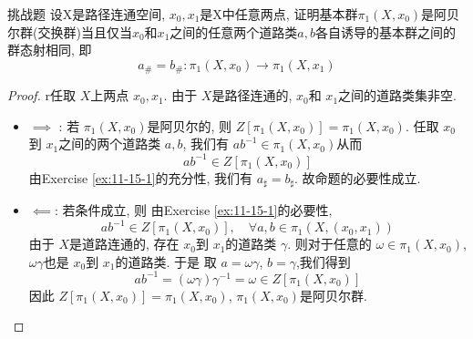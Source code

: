 \documentclass[../main.tex]{subfiles}
\begin{document}
\begin{exercise}{挑战题}{}
设X是路径连通空间, $x_0, x_1$是X中任意两点, 证明基本群$\pi_1(X, x_0)$是阿贝尔群(交换群)当且仅当$x_0$和$x_1$之间的任意两个道路类$a, b$各自诱导的基本群之间的群态射相同, 即
\[
a_\# = b_\#: \pi_1(X, x_0) \longrightarrow \pi_1(X, x_1)
\]
\end{exercise}

\begin{proof}
   
r任取 \(  X  \)上两点 \(  x_0,x_1  \).   由于 \(  X  \)是路径连通的, \(   x_0  \)和 \(  x_1  \)之间的道路类集非空. 
   \begin{itemize}
    \item \(  \implies   \) : 若 \(   \pi _1 \left( X,x_0 \right)   \)是阿贝尔的, 则 \(  Z[ \pi _1 \left( X,x_0 \right) ] =  \pi _1 \left( X,x_0 \right)  \).   任取 \(  x_0  \)到 \(  x_1  \)之间的两个道路类 \(  a,b  \), 我们有 \(  ab^{-1}   \in  \pi _1 \left( X,x_0 \right) \)从而     \[
    ab^{-1} \in Z[ \pi _1 \left( X,x_0 \right) ]
    \]   由Exercise \ref{ex:11-15-1}的充分性, 我们有 \(  a_{\sharp }= b_{\sharp }  \). 故命题的必要性成立. 
    \item \(  \impliedby   \): 若条件成立, 则 由Exercise \ref{ex:11-15-1}的必要性,   \[
    a b ^{-1} \in Z[ \pi _1 \left( X,x_0 \right) ],\quad \forall a,b\in  \pi _1 \left( X,\left( x_0,x_1 \right)  \right) 
   \]由于 \(  X  \)是道路连通的, 存在 \(  x_0\)到 \(  x_1  \)的道路类 \(   \gamma   \).    则对于任意的 \(   \omega \in  \pi _1 \left( X,x_0 \right)   \),  \(   \omega  \gamma   \)也是 \(  x_0  \)到 \(  x_1  \)的道路类.    于是 取 \(  a=  \omega  \gamma   \), \(  b=  \gamma   \),我们得到 \[
   ab^{-1} = \left(  \omega  \gamma  \right) \gamma ^{-1} =  \omega \in Z[ \pi _1 \left( X,x_0 \right) ] 
   \]  因此 \(  Z[ \pi _1 \left( X,x_0 \right) ]=  \pi _1 \left( X,x_0 \right)   \), \(   \pi _1 \left( X,x_0 \right)   \)是阿贝尔群.  
   \end{itemize}
   
\end{proof}
\end{document}
